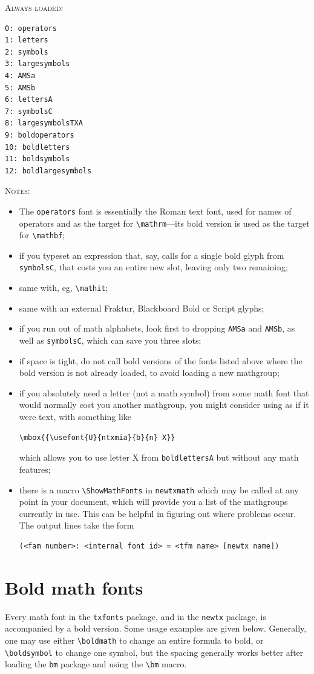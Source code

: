 \documentclass[11pt]{article}
\theoremstyle{oldplain}
\theoremstyle{plain}
\begin{document}
\textsc{Always loaded:}
\begin{verbatim}
0: operators
1: letters
2: symbols
3: largesymbols
4: AMSa
5: AMSb
6: lettersA
7: symbolsC
8: largesymbolsTXA
9: boldoperators
10: boldletters
11: boldsymbols
12: boldlargesymbols
\end{verbatim}
\textsc{Notes:}
\begin{itemize}
\item
The {\tt operators} font is essentially the Roman text font, used for names of operators and as the target for \verb|\mathrm|---its bold version is used as the target for \verb|\mathbf|;
\item if you typeset an expression that, say, calls for a single bold glyph from  {\tt symbolsC}, that costs you an entire new slot, leaving only two remaining;
\item same with, eg, \verb|\mathit|;
\item same with an external Fraktur, Blackboard Bold or Script glyphs;
\item if you run out of math alphabets, look first to dropping {\tt AMSa} and {\tt AMSb}, as well as {\tt symbolsC}, which can save you three slots;
\item if space is tight, do not call bold versions of the fonts listed above where the bold version is not already loaded, to avoid loading a new mathgroup; 
\item if you absolutely need a letter (not a math symbol) from some math font that would normally cost you another mathgroup, you might consider using as if it were text, with something like
\begin{verbatim}
\mbox{{\usefont{U}{ntxmia}{b}{n} X}}
\end{verbatim}
which allows you to use letter X from {\tt boldlettersA} but without any math features;
\item there is a macro \verb|\ShowMathFonts| in {\tt newtxmath} which may be called at any point in your document, which will provide you a list of the mathgroups currently in use. This can be helpful in figuring out where problems occur. The output lines take the form
\begin{verbatim}
(<fam number>: <internal font id> = <tfm name> [newtx name])
\end{verbatim}

\end{itemize}
\section{Bold math fonts}\label{sec:boldmath}
Every math font in the {\tt txfonts} package, and in the {\tt newtx} package, is accompanied by a bold version. Some usage examples are given below. Generally, one may use either \verb|\boldmath| to change an entire formula to bold, or \verb|\boldsymbol| to change one symbol, but the spacing generally works better after loading the {\tt bm} package and using the \verb|\bm| macro.
\end{document}
